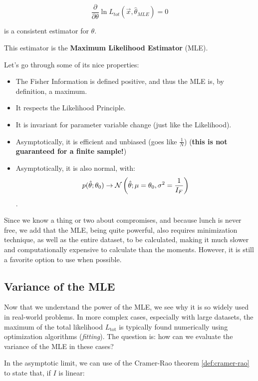 \begin{equation}
	\frac{\partial}{\partial\theta} \ln L_{tot}(\vec{x},\hat\theta_{MLE}) = 0 
	\tag{Likelihood equation}
	\label{eq:likelihood}
\end{equation}

is a consistent estimator for $\theta$. 

This estimator is the \textbf{Maximum Likelihood Estimator} (MLE).

Let's go through some of its nice properties:
\begin{itemize}
	\item The Fisher Information is defined positive, and thus the MLE is, by definition, a maximum.
	\item It respects the Likelihood Principle.
	\item It is invariant for parameter variable change (just like the Likelihood).
	\item Asymptotically, it is efficient and unbiased (goes like $\frac{1}{N}$) (\textbf{this is not guaranteed for a finite sample!})
	\item Asymptotically, it is also normal, with: \[p(\hat\theta;\theta_0) \rightarrow \mathcal{N}\left(\hat{\theta}; \mu=\theta_0,\sigma^2=\frac{1}{I_F}\right)\].
\end{itemize}

Since we know a thing or two about compromises, and because lunch is never free, we add that the MLE, being quite powerful, also requires minimization technique, as well as the entire dataset, to be calculated, making it much slower and computationally expensive to calculate than the moments. However, it is still a favorite option to use when possible. 


\subsection{Variance of the MLE}

Now that we understand the power of the MLE, we see why it is so widely used in real-world problems. In more complex cases, especially with large datasets, the maximum of the total likelihood $L_{\text{tot}}$ is typically found numerically using optimization algorithms (\emph{fitting}). The question is: how can we evaluate the variance of the MLE in these cases?

In the asymptotic limit, we can use of the Cramer-Rao theorem \ref{def:cramer-rao} to state that, if $I$ is linear:

